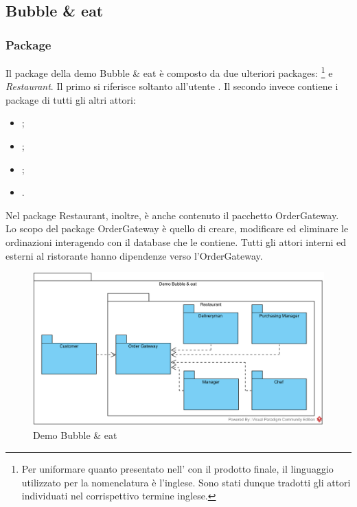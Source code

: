 \subsection{Bubble \& eat} \label{bubbleeat}

\subsubsection{Package}
Il package della demo Bubble \& eat è composto da due ulteriori packages: \Customer{}\footnote{Per uniformare quanto presentato nell'\AnalisiDeiRequisiti{} con il prodotto finale, il linguaggio utilizzato per la nomenclatura è l'inglese. Sono stati dunque tradotti gli attori individuati nel corrispettivo termine inglese.} e \textit{Restaurant}. 
Il primo si riferisce soltanto all'utente \Customer{}. Il secondo invece contiene i package di tutti gli altri attori:
\begin{itemize}
	\item \Manager{};
	\item \Chef{};
	\item \Deliveryman{};
	\item \Purchasingmanager{}.
\end{itemize}
Nel package Restaurant, inoltre, è anche contenuto il pacchetto Order\-Gateway.\\
Lo scopo del package Order\-Gateway è quello di creare, modificare ed eliminare le ordinazioni interagendo con il database che le contiene.
Tutti gli attori interni ed esterni al ristorante hanno dipendenze verso l'Order\-Gateway.
\begin{figure}[H]
	\centering
	\includegraphics[width=14cm]{diagrammi_img/classi_e_package/demo_packages.png}
	\caption{Demo Bubble \& eat}
\end{figure}


